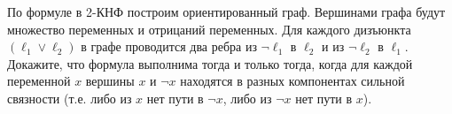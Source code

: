 По формуле в 2-КНФ построим ориентированный граф. Вершинами графа будут множество переменных и отрицаний
переменных. Для каждого дизъюнкта $(\ell_1\lor \ell_2)$ в графе проводится два ребра из $\lnot \ell_1$ в
$\ell_2$ и из $\lnot \ell_2$ в $\ell_1$. Докажите, что формула выполнима тогда и только тогда, когда для
каждой переменной $x$ вершины $x$ и $\lnot x$ находятся в разных компонентах сильной связности (т.е. либо
из $x$ нет пути в $\lnot x$, либо из $\lnot x$ нет пути в $x$).
